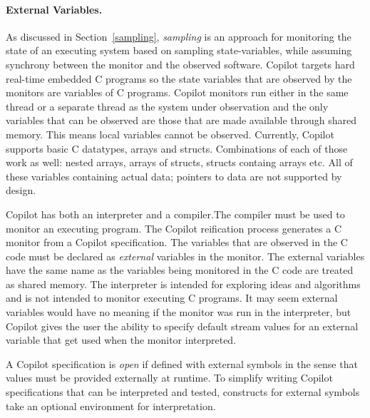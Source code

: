 \paragraph{External Variables.}


As discussed in Section~\ref{sampling}, \emph{sampling} is an approach
for monitoring the state of an executing system based on sampling
state-variables, while assuming synchrony between the monitor and the
observed software. Copilot targets hard real-time embedded C programs
so the state variables that are observed by the monitors are variables
of C programs. Copilot monitors run either in the same thread or a
separate thread as the system under observation and the only variables
that can be observed are those that are made available through shared
memory. This means local variables cannot be observed. Currently,
Copilot supports basic C datatypes, arrays and structs. Combinations of each of
those work as well: nested arrays, arrays of structs, structs containg arrays
etc. All of these variables containing actual data; pointers to data are not
supported by design.


Copilot has both an interpreter and a compiler.The compiler must be
used to monitor an executing program. The Copilot reification process
generates a C monitor from a Copilot specification. The variables that
are observed in the C code must be declared as \emph{external}
variables in the monitor. The external variables have the same name as
the variables being monitored in the C code are treated as shared
memory. The interpreter is intended for exploring ideas and algorithms
and is not intended to monitor executing  C
programs. It may seem external variables would have no meaning if the
monitor was run in the interpreter, but Copilot gives the user the
ability to specify default stream values for an external variable that
get used when the monitor interpreted.

 A Copilot specification is \emph{open} if defined with external symbols in the
sense that values must be provided externally at runtime.  To simplify writing
Copilot specifications that can be interpreted and tested, constructs for
external symbols take an optional environment for interpretation.

